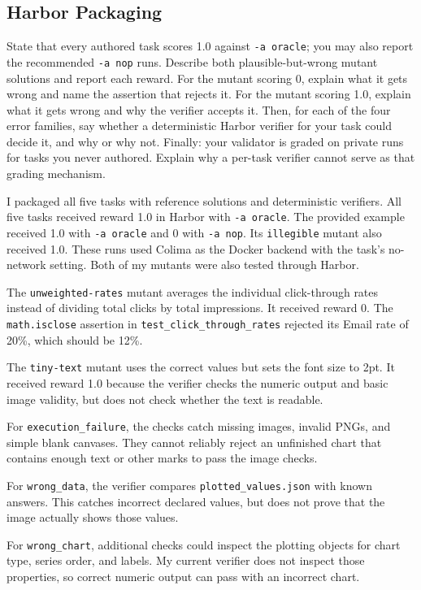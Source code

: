 \documentclass[11pt]{article}
\begin{document}
\subsection{Harbor Packaging}
State that every authored task scores 1.0 against \texttt{-a oracle}; you may
also report the recommended \texttt{-a nop} runs. Describe both plausible-but-wrong
mutant solutions and report each reward. For the mutant scoring 0, explain what
it gets wrong and name the assertion that rejects it. For the mutant scoring
1.0, explain what it gets wrong and why the verifier accepts it. Then, for each
of the four error families, say whether a deterministic Harbor verifier for your
task could decide it, and why or why not. Finally: your validator is graded on
private runs for tasks you never authored. Explain why a per-task verifier
cannot serve as that grading mechanism.

\medskip
I packaged all five tasks with reference solutions and deterministic verifiers.
All five tasks received reward 1.0 in Harbor with \texttt{-a oracle}.
The provided example received 1.0 with \texttt{-a oracle} and 0 with
\texttt{-a nop}. Its \texttt{illegible} mutant also received 1.0.
These runs used Colima as the Docker backend with the task's no-network
setting. Both of my mutants were also tested through Harbor.

The \texttt{unweighted-rates} mutant averages the individual click-through rates
instead of dividing total clicks by total impressions. It received reward 0.
The \texttt{math.isclose} assertion in \texttt{test\_click\_through\_rates}
rejected its Email rate of 20\%, which should be 12\%.

The \texttt{tiny-text} mutant uses the correct values but sets the font size to
2pt. It received reward 1.0 because the verifier checks the numeric output and
basic image validity, but does not check whether the text is readable.

For \texttt{execution\_failure}, the checks catch missing images, invalid PNGs,
and simple blank canvases. They cannot reliably reject an unfinished chart
that contains enough text or other marks to pass the image checks.

For \texttt{wrong\_data}, the verifier compares \texttt{plotted\_values.json}
with known answers. This catches incorrect declared values, but does not prove
that the image actually shows those values.

For \texttt{wrong\_chart}, additional checks could inspect the plotting objects
for chart type, series order, and labels. My current verifier does not inspect
those properties, so correct numeric output can pass with an incorrect chart.
\end{document}
